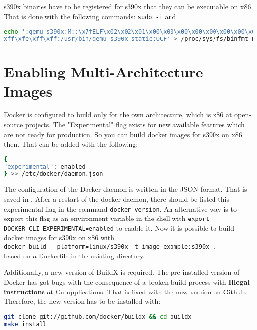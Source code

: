 s390x binaries have to be registered for s390x that they can be executable on x86. That is done with the following commands: \lstinline!sudo -i! and 
\begin{lstlisting}[language=bash, numberstyle=\myHexNumber, caption={Register s390x binaries},captionpos=b]
echo ':qemu-s390x:M::\x7fELF\x02\x02\x01\x00\x00\x00\x00\x00\x00\x00\x00\x00\x00\x02\x00\x16:\xff\xff\xff\xff\xff\xff\xff\x00\xff\xff\xff\xff\xff\xff\xff\xff\
xff\xfe\xff\xff:/usr/bin/qemu-s390x-static:OCF' > /proc/sys/fs/binfmt_misc/register
\end{lstlisting}

\section{Enabling Multi-Architecture Images}\label{Multi-Architecture-Images}

Docker is configured to build only for the own architecture, which is x86 at open-source projects. The "Experimental" flag exists for new available features which are not ready for production. So you can build docker images for s390x on x86 then. That can be added with the following:

\begin{lstlisting}[language=bash,caption={Docker Experimental Flag},captionpos=b]
{
"experimental": enabled
} >> /etc/docker/daemon.json
\end{lstlisting}

The configuration of the Docker daemon is written in the JSON format. That is saved in .
After a restart of the docker daemon, there should be listed this experimental flag in the command  \lstinline!docker version!. An alternative way is to export this flag as an environment variable in the shell with  \lstinline!export DOCKER_CLI_EXPERIMENTAL=enabled! to enable it. Now it is possible to build docker images for s390x on x86 with \\ \lstinline!docker build --platform=linux/s390x -t image-example:s390x .! \\
based on a Dockerfile in the existing directory.

 
Additionally, a new version of BuildX is required. The pre-installed version of Docker has got bugs with the consequence of a broken build process with \textbf{Illegal instructions} at Go applications. That is fixed with the new version on Github. \\
Therefore, the new version has to be installed with:
\begin{lstlisting}[language=bash,caption={BuildX Upgrade},captionpos=b]
git clone git://github.com/docker/buildx && cd buildx
make install
\end{lstlisting}
 


